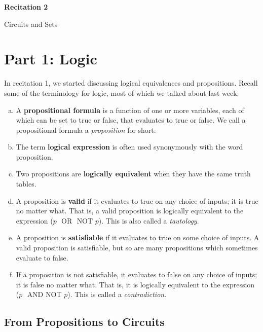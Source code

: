 \documentclass[12pt,letterpaper]{article}
\newenvironment{22enumerate}{\begin{enumerate}[a.]\itemsep0em}{\end{enumerate}}
\begin{document}
  \thispagestyle{firstpagestyle}
  \begin{center}
    {\large \textbf{Recitation 2}}
    
    {\large Circuits and Sets}

  \end{center}

	\section*{Part 1: Logic}
	
	In recitation 1, we started discussing logical equivalences and propositions. Recall some of the terminology for logic, most of which we talked about last week:
	
	\begin{22enumerate}
	
	\item A \textbf{propositional formula} is a function of one or more variables, each of which can be set to true or false, that evaluates to true or false. We call a propositional formula a \textit{proposition} for short. 
	
	\item The term \textbf{logical expression} is often used synonymously with the word proposition. 
	
	\item Two propositions are \textbf{logically equivalent} when they have  the same truth tables.
	
	\item A proposition is \textbf{valid} if it evaluates to true on any choice of inputs; it is true no matter what. That is, a valid proposition is logically equivalent to the expression ($p$ $\text{ OR }$ $\text{NOT } p$). This is also called a \textit{tautology}. 
	
	\item A proposition is \textbf{satisfiable} if it evaluates to true on some choice of inputs. A valid proposition is satisfiable, but so are many propositions which sometimes evaluate to false.
	
	\item If a proposition is not satisfiable, it evaluates to false on any choice of inputs; it is false no matter what. That is, it is logically equivalent to the expression ($p$ $\text{ AND }\text{NOT } p$). This is called a \textit{contradiction}.
	
	\end{22enumerate}

	\subsection*{From Propositions to Circuits}
\end{document}
